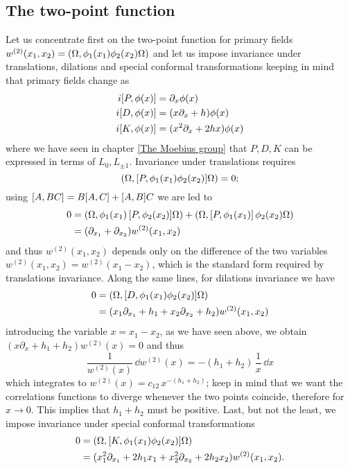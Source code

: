 \subsection{The two-point function}
\label{the two-point function}
Let us concentrate first on the two-point function 
for primary fields
$w^{(2)}(x_1,x_2)=(\Omega,\phi_1(x_1)
\phi_2(x_2)\Omega)$ and let
us impose invariance under translations, dilations
and special conformal transformations keeping in 
mind that primary fields change as
\begin{align*}
i[P,\phi(x)]&=\partial_x\phi(x)\\
i[D,\phi(x)]&=(x\partial_x+h)\phi(x)\\
i[K,\phi(x)]&=(x^2\partial_x+2hx)\phi(x)
\end{align*}
where we have seen in chapter \ref{The Moebius group} that $P,D,K$ can
be expressed in terms of $L_0, L_{\pm 1}$.
Invariance under translations requires
\[
(\Omega,[P,\phi_1(x_1)\phi_2(x_2)]\Omega)=0;
\]
using $[A,BC]=B[A,C]+[A,B]C$ we are led to
\begin{align*}
0&=(\Omega,\phi_1(x_1)\,[P,\phi_2(x_2)]\Omega)+
(\Omega,[P,\phi_1(x_1)]\,\phi_2(x_2)\Omega)\\
&=(\partial_{x_1}+\partial_{x_2})w^{(2)}(x_1,x_2)\\
\end{align*}
and thus $w^{(2)}(x_1,x_2)$ depends only on the difference
of the two variables $w^{(2)}(x_1,x_2)=w^{(2)}(x_1-x_2)$, 
which is the standard form required by translations invariance.
Along the same lines, for dilations invariance we have
\begin{align*}
0&=(\Omega,[D,\phi_1(x_1)\phi_2(x_2)]\Omega)\\
&=(x_1\partial_{x_1}+h_1+x_2\partial_{x_2}+h_2)w^{(2)}(x_1,x_2)\\
\end{align*}
introducing the variable $x=x_1-x_2$, as we have seen 
above, we obtain $(x\partial_x + h_1+h_2)w^{(2)}(x)=0$ 
and thus
\[
\frac{1}{w^{(2)}(x)}\,\dd w^{(2)}(x)=-(h_1+h_2)\,\frac{1}{x}\,\dd x
\]
which integrates to 
${w^{(2)}(x)}=c_{12}\,x^{-(h_1+h_2)}$;
keep in mind that we want the correlations functions to
diverge whenever the two points coincide, therefore for
$x\to 0$. This implies that $h_1+h_2$ must be positive.
Last, but not the least, we impose invariance under special
conformal transformations
\begin{align*}
0&=(\Omega,[K,\phi_1(x_1)\phi_2(x_2)]\Omega)\\
&=(x_1^2\partial_{x_1}+2h_1 x_1+x_2^2\partial_{x_2}+2h_2 x_2)
w^{(2)}(x_1,x_2).\\
\end{align*}
